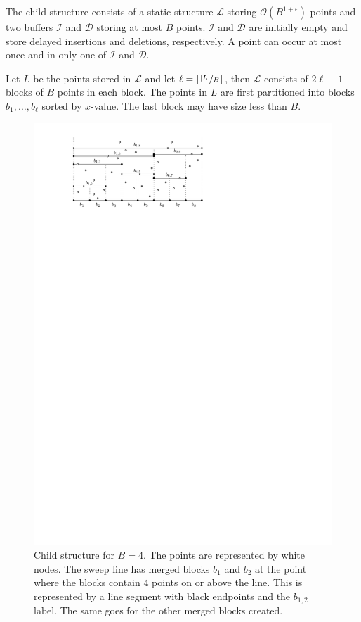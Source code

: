 \documentclass[twoside,11pt,openright]{report}
\begin{document}
The child structure consists of a static structure $\mathcal{L}$ storing $\mathcal{O}(B^{1+\epsilon})$ points and two buffers $\mathcal{I}$ and $\mathcal{D}$ storing at most $B$ points. $\mathcal{I}$ and $\mathcal{D}$ are initially empty and store delayed insertions and deletions, respectively. A point can occur at most once and in only one of $\mathcal{I}$ and $\mathcal{D}$.

Let $L$ be the points stored in $\mathcal{L}$ and let $\ell = \lceil \nicefrac{\vert L \vert}{B}\rceil$, then $\mathcal{L}$ consists of $2\ell-1$ blocks of $B$ points in each block. The points in $L$ are first partitioned into blocks $b_1,\dots,b_\ell$ sorted by $x$-value. The last block may have size less than $B$.

\begin{figure}[h]
	\centering
	\includegraphics[scale=1]{../figures/sweep-line}
	\caption{Child structure for $B=4$. The points are represented by white nodes. The sweep line has merged blocks $b_1$ and $b_2$ at the point where the blocks contain $4$ points on or above the line. This is represented by a line segment with black endpoints and the $b_{1,2}$ label. The same goes for the other merged blocks created.}
	\label{fig:sweep-line}
\end{figure}
\end{document}
